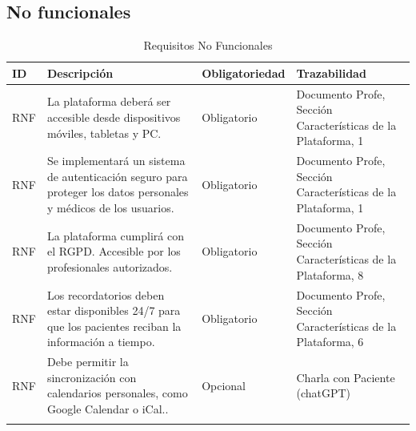 \documentclass{article}
\begin{document}
\subsection{No funcionales}

\begin{table}[H]
	\centering
	\caption{Requisitos No Funcionales}
	\begin{tabular}{@{} p{2.5cm} p{6.5cm} p{3cm} p{3cm} @{}}
		\toprule
		\textbf{ID} & \textbf{Descripción} & \textbf{Obligatoriedad} & \textbf{Trazabilidad} \\
		\midrule
		\addlinespace
		\stepcounter{requisitosNoFuncionales} RNF\therequisitosNoFuncionales & La plataforma deberá ser accesible desde dispositivos móviles, tabletas y PC. & Obligatorio & Documento Profe, Sección Características de la Plataforma, 1 \\
		\addlinespace
		\stepcounter{requisitosNoFuncionales} RNF\therequisitosNoFuncionales & Se implementará un sistema de autenticación seguro para proteger los datos personales y médicos de los usuarios. & Obligatorio & Documento Profe, Sección Características de la Plataforma, 1 \\
		\addlinespace
		\stepcounter{requisitosNoFuncionales} RNF\therequisitosNoFuncionales &La plataforma cumplirá con el RGPD. Accesible por los profesionales autorizados. & Obligatorio & Documento Profe, Sección Características de la Plataforma, 8 \\
		\addlinespace
		\stepcounter{requisitosNoFuncionales}
		RNF\therequisitosNoFuncionales & Los recordatorios deben estar disponibles 24/7 para que los pacientes reciban la información a tiempo. & Obligatorio & Documento Profe, Sección Características de la Plataforma, 6 \\
		\addlinespace
		\stepcounter{requisitosNoFuncionales}
		RNF\therequisitosNoFuncionales &  Debe permitir la sincronización con calendarios personales, como Google Calendar o iCal.. & Opcional & Charla con Paciente (chatGPT) \\
		\addlinespace
		
		\bottomrule
	\end{tabular}
\end{table}
\end{document}
